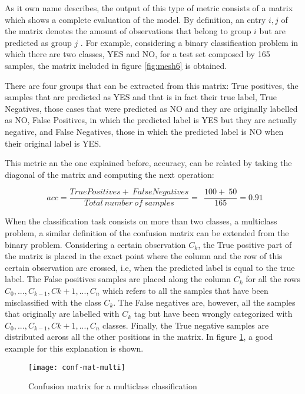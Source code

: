 	As it own name describes, the output of this type of metric consists of a matrix which shows a complete evaluation of the model. By definition, an entry $i,j$ of the matrix denotes the amount of observations that belong to group $i$ but are predicted as group $j$ \cite{Scikit-learn}. For example, considering a binary classification problem in which there are two classes, YES and NO, for a test set composed by 165 samples, the matrix included in figure \ref{fig:mesh6} is obtained. 
	
	There are four groups that can be extracted from this matrix: True positives, the samples that are predicted as YES and that is in fact their true label, True Negatives, those cases that were predicted as NO and they are originally labelled as NO, False Positives, in which the predicted label is YES but they are actually negative, and False Negatives, those in which the predicted label is NO when their original label is YES.
	
	This metric an the one explained before, accuracy, can be related by taking the diagonal of the matrix and computing the next operation:
	
	\[
	\ \ acc = \frac{TruePositives +\ FalseNegatives}{Total\ number\ of\ samples} = 
	\ \ \frac{100 +\ 50}{165} = 0.91
	\]
	
	When the classification task consists on more than two classes, a multiclass problem, a similar definition of the confusion matrix can be extended from the binary problem. Considering a certain observation $C_k$, the True positive part of the matrix is placed in the exact point where the column and the row of this certain observation are crossed, i.e, when the predicted label is equal to the true label. The False positives samples are placed along the column $C_k$ for all the rows $C_0, ..., C_{k-1}, C{k+1}, ..., C_n$ which refers to all the samples that have been misclassified with the class $C_k$. The False negatives are, however, all the samples that originally are labelled with $C_k$ tag but have been wrongly categorized with $C_0, ..., C_{k-1}, C{k+1}, ..., C_n$ classes. Finally, the True negative samples are distributed across all the other positions in the matrix. In figure \ref{fig:mesh9}, a good example for this explanation is shown.
	
	\begin{figure}[h]
		\centering
		\captionsetup{justification=centering}
		\texttt{[image: conf-mat-multi]}
		\caption{Confusion matrix for a multiclass classification \cite{Kruger2018}}
		\label{fig:mesh9}
	\end{figure}
	
